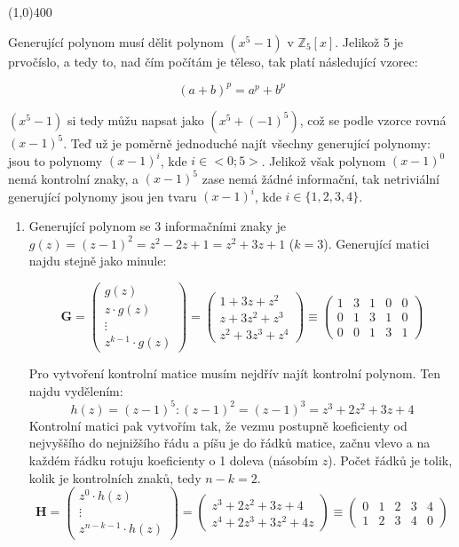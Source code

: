 \documentclass{article}
\begin{document}
\line(1,0){400}

Generující polynom musí dělit polynom $(x^5 - 1) \mbox{ v } \mathbb{Z}_5[x]$. Jelikož 5 je prvočíslo, a tedy to, nad čím počítám je těleso, tak platí následující vzorec:

\[ (a+b)^p = a^p + b^p \]

$(x^5 - 1)$ si tedy můžu napsat jako $(x^5 + (-1)^5)$, což se podle vzorce rovná $(x-1)^5$. Teď už je poměrně jednoduché najít všechny generující polynomy: jsou to polynomy $(x-1)^i$, kde $i \in <0;5>$. Jelikož však polynom $(x-1)^0$ nemá kontrolní znaky, a $(x-1)^5$ zase nemá žádné informační, tak netriviální generující polynomy jsou jen tvaru $(x-1)^i$, kde $i \in \{1,2,3,4\}$.

\begin{enumerate}
	\item Generující polynom se 3 informačními znaky je $g(z) = (z-1)^2 = z^2 - 2z + 1 = z^2 + 3z + 1$ ($k=3$). Generující matici najdu stejně jako minule: 

\[ \mathbf{G} = \begin{pmatrix}
  g(z) \\
  z\cdot g(z) \\
  \vdots \\
  z^{k-1} \cdot g(z)
	\end{pmatrix} = 
	\begin{pmatrix}
  1 + 3z + z^2\\
  z + 3z^2 + z^3\\
  z^2 + 3z^3 + z^4 
	\end{pmatrix} \equiv
	\begin{pmatrix}
  1 & 3 & 1 & 0 & 0\\
  0 & 1 & 3 & 1 & 0\\
  0 & 0 & 1 & 3 & 1
	\end{pmatrix}
	\]
	
	Pro vytvoření kontrolní matice musím nejdřív najít kontrolní polynom. Ten najdu vydělením: \[h(z) = (z-1)^5:(z-1)^2 = (z-1)^3 = z^3 + 2z^2 + 3z + 4\] Kontrolní matici pak vytvořím tak, že vezmu postupně koeficienty od nejvyššího do nejnižšího řádu a píšu je do řádků matice, začnu vlevo a na každém řádku rotuju koeficienty o 1 doleva (násobím \(z\)). Počet řádků je tolik, kolik je kontrolních znaků, tedy \( n - k = 2\).
\[
 \mathbf{H} = \begin{pmatrix}
	z^0 \cdot h(z) \\
	\vdots \\
	z^{n-k-1}\cdot h(z)
	\end{pmatrix} = 
\begin{pmatrix}
 z^3 + 2z^2 + 3z + 4 \\
 z^4 + 2z^3 + 3z^2 + 4z
\end{pmatrix} \equiv
\begin{pmatrix}
  0 & 1 & 2 & 3 & 4\\
  1 & 2 & 3 & 4 & 0 
 \end{pmatrix} 
\]	
	

\end{enumerate}
\end{document}
